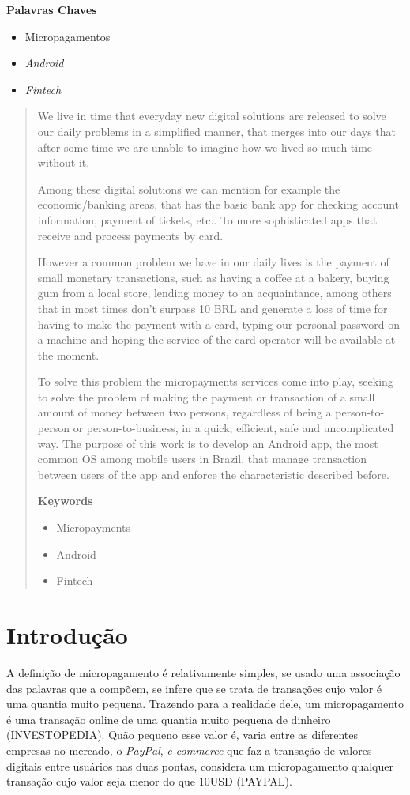 \documentclass[hidelinks,12pt]{article}
\begin{document}
\textbf{Palavras Chaves}
\begin{itemize}
	\item Micropagamentos
	\item \textit{Android}
	\item \textit{Fintech}
\end{itemize}
\newpage
{}
\begin{abstract}
We live in time that everyday new digital solutions are released to solve our daily problems in a simplified manner, that merges into our days that after some time we are unable to imagine how we lived so much time without it.

Among these digital solutions we can mention for example the economic/banking areas, that has the basic bank app for checking account information, payment of tickets, etc.. To more sophisticated apps that receive and process payments by card.

However a common problem we have in our daily lives is the payment of small monetary transactions, such as having a coffee at a bakery, buying gum from a local store, lending money to an acquaintance, among others that in most times don’t surpass 10 BRL and generate a loss of time for having to make the payment with a card, typing our personal password on a machine and hoping the service of the card operator will be available at the moment.

To solve this problem the micropayments services come into play, seeking to solve the problem of making the payment or transaction of a small amount of money between two persons, regardless of being a person-to-person or person-to-business, in a quick, efficient, safe and uncomplicated way. The purpose of this work is to develop an Android app, the most common OS among mobile users in Brazil, that manage transaction between users of the app and enforce the characteristic described before.
\newline


\textbf{Keywords}
\begin{itemize}
	\item Micropayments
	\item Android
	\item Fintech
\end{itemize}
\end{abstract}
\newpage
{}
\begingroup
\hypersetup{hidelinks}
\tableofcontents
\endgroup
\newpage
{}
\section{Introdu\c{c}\~ao}
A defini\c{c}\~ao de micropagamento \'e relativamente simples, se usado uma associa\c{c}\~ao das palavras que a comp\~oem, se infere que se trata de transa\c{c}\~oes cujo valor \'e uma quantia muito pequena. Trazendo para a realidade dele, um micropagamento \'e uma transa\c{c}\~ao online de uma quantia muito pequena de dinheiro (INVESTOPEDIA). Qu\~ao pequeno esse valor \'e, varia entre as diferentes empresas no mercado, o \textit{PayPal}, \textit{e-commerce} que faz a transa\c{c}\~ao de valores digitais entre usu\'arios nas duas pontas, considera um micropagamento qualquer transa\c{c}\~ao cujo valor seja menor do que 10USD (PAYPAL).
\end{document}
